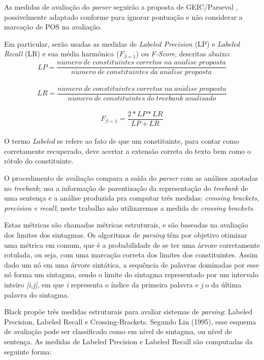 As medidas de avaliação do \emph{parser} seguirão a proposta de GEIC/Parseval \cite{black91}, possivelmente adaptado conforme \cite{collins97} para ignorar pontuação e não considerar a marcação de POS na avaliação. 

Em particular, serão usadas as medidas de \emph{Labeled Precision} (LP) e \emph{Labeled Recall} (LR) e sua média harmônica ($F_{\beta=1}$) ou \emph{F-Score}, descritas abaixo:
\\
$$LP = \frac{n\acute{u}mero\; de\; constituintes\; corretos\; na\; an\acute{a}lise\; proposta}{n\acute{u}mero\; de\; constituintes\; da\; an\acute{a}lise\; proposta}$$
\\
$$LR = \frac{n\acute{u}mero\; de\; constituintes\; corretos\; na\; an\acute{a}lise\; proposta}{n\acute{u}mero\; de\; constituintes\; do\; \mathit{treebank}\; analisado}$$
\\
$$F_{\beta=1} = \frac{2*LP*LR}{LP+LR}$$
\\
O termo \emph{Labeled} se refere ao fato de que um constituinte, para contar como corretamente recuperado, deve acertar a extensão correta do texto bem como o rótulo do constituinte.

O procedimento de avaliação compara a saída do \emph{parser} com as análises anotadas no \emph{treebank}; usa a informação de parentização da representação do \emph{treebank} de uma sentença e a análise produzida pra computar três medidas: \emph{crossing brackets, precision e recall}; neste trabalho não utilizaremos a medida de \emph{crossing brackets}.

Estas métricas são chamadas métricas estruturais, e são baseadas na avaliação dos limites dos sintagmas. Os algoritmos de \emph{parsing} têm por objetivo otimizar uma métrica em comum, que é a probabilidade de se ter uma árvore corretamente rotulada, ou seja, com uma marcação correta dos limites dos constituintes. Assim dado um nó em uma árvore sintática, a sequência de palavras dominadas por esse nó forma um sintagma, sendo o limite do sintagma representado por um intervalo inteiro \emph{[i,j]}, em que \emph{i} representa o índice da primeira palavra e \emph{j} o da última palavra do sintagma.

Black \cite{black91} propõe três medidas estruturais para avaliar sistemas de \emph{parsing}: Labeled Precision, Labeled Recall e Crossing-Brackets. Segundo Lin (1995), esse esquema de avaliação pode ser classificado como em nível de sintagma, ou nível de sentença. 
As medidas de Labeled Precision e Labeled Recall são computadas da seguinte forma:

